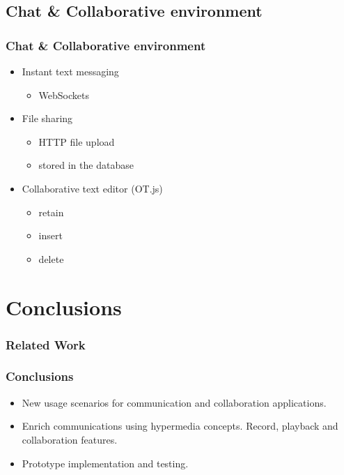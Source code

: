 \documentclass[compress]{beamer}
\begin{document}
\subsection{Chat \& Collaborative environment}

		\begin{frame}[c]
		\frametitle{Chat \& Collaborative environment}


		\begin{itemize}
		\item Instant text messaging
			\begin{itemize}
			\item WebSockets
			\end{itemize}

		\item File sharing
			\begin{itemize}
			\item HTTP file upload
			\item stored in the database
			\end{itemize}
		
		\item Collaborative text editor (OT.js)
			\begin{itemize}
			\item retain
			\item insert
			\item delete
			\end{itemize}
		

		\end{itemize}
		

		\end{frame}



\section{Conclusions}\label{concl} %
\begin{frame}[t,shrink]
\frametitle{Related Work} 
\end{frame}

\begin{frame}[c]
		\frametitle{Conclusions}
		\begin{itemize}
\item New usage scenarios for communication and collaboration applications.
		\vfill

\item Enrich communications using hypermedia concepts. Record, playback and collaboration features.
		\vfill

\item Prototype implementation and testing.
		\end{itemize}

	\end{frame}
\end{document}

